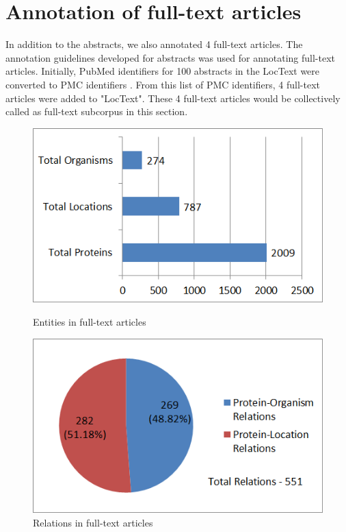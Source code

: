 \section{Annotation of full-text articles} \label{sec:full-text}

In addition to the abstracts, we also annotated 4 full-text articles. The annotation guidelines developed for abstracts was used for annotating full-text articles. Initially, PubMed identifiers for 100 abstracts in the LocText were converted to PMC identifiers \cite{pubmedtopmc}. From this list of PMC identifiers, 4 full-text articles were added to "LocText". These 4 full-text articles would be collectively called as full-text subcorpus in this section.

\begin{figure}
\centering
\begin{minipage}{.5\textwidth}
  \centering
  \includegraphics[width=.95\textwidth]{figures/1_FullTextEntities.png}
  \caption{Entities in full-text articles}
  \label{fig:FT_entities}
\end{minipage}%
\begin{minipage}{.5\textwidth}
  \centering
  \includegraphics[width=.95\textwidth]{figures/1_FullTextRelationDistribution.png}
  \caption{Relations in full-text articles}
  \label{fig:FT_relations}
\end{minipage}
\end{figure}

